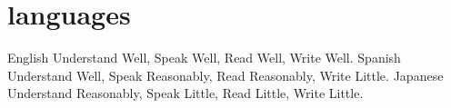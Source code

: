 \documentclass[]{twentysecondcv_en}
\begin{document}
\section{languages}

\begin{twentyshort}
  \twentyitemshort
    {English}
    {Understand Well, Speak Well, Read Well, Write Well.}
  \twentyitemshort
    {Spanish}
    {Understand Well, Speak Reasonably, Read Reasonably, Write Little.}
  \twentyitemshort
    {Japanese}
    {Understand Reasonably, Speak Little, Read Little, Write Little.}
\end{twentyshort}

\end{document}
